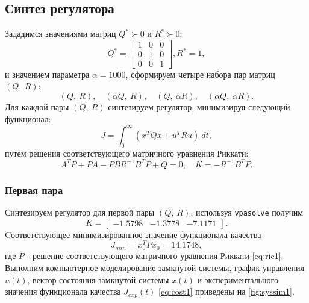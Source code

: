 \subsection{Синтез регулятора}

Зададимся значениями матриц $Q^*\succ0$ и $R^*\succ0$:
\begin{equation*}
    Q^*=\begin{bmatrix}
        1 & 0 & 0\\
        0 & 1 & 0\\
        0 & 0 & 1
    \end{bmatrix},
    R^*=1,
\end{equation*}
и значением параметра $\alpha=1000$, сформируем четыре набора пар матриц $(Q,\ R)$:
$$(Q,\ R),\quad (\alpha Q,\ R),\quad (Q,\ \alpha R),\quad (\alpha Q,\ \alpha R).$$
Для каждой пары $(Q,\ R)$ синтезируем регулятор, минимизируя следующий функционал:
\begin{equation}
    \label{eq:cost1}
    J=\int_0^{\infty}(x^TQx+u^TRu)\ dt,
\end{equation}
путем решения  соответствующего матричного уравнения Риккати:
\begin{equation}
    \label{eq:ric1}
    A^TP+PA-PBR^{-1}B^TP+Q=0,\quad K=-R^{-1}B^TP.
\end{equation}

\subsubsection{Первая пара}

Синтезируем регулятор для первой пары $(Q,\ R)$, используя \texttt{vpasolve}
получим
\begin{equation*}
    K=\begin{bmatrix}
        -1.5798 &  -1.3778  & -7.1171
    \end{bmatrix}.
\end{equation*}
Cоответствующее минимизированное значение функционала качества
\begin{equation*}
    J_{min}=x_0^TPx_0=14.1748,
\end{equation*}
где $P$ - решение соответствующего матричного уравнения Риккати \eqref{eq:ric1}.
Выполним компьютерное моделирование замкнутой системы,
график управления $u(t)$, вектор состояния замкнутой системы $x(t)$ и 
экспериментального значения функционала качества $J_{exp}(t)$ \eqref{eq:cost1}
приведены на \autoref{fig:syssim1}.


